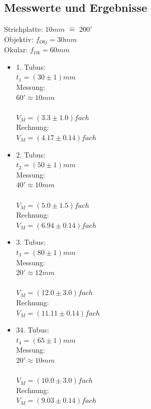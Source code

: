 \documentclass[12pt,a4paper]{article}
\begin{document}
\begin{multicols}{2}
\subsection{Messwerte und Ergebnisse}

Strichplatte: $10mm$ $\widehat{=}$ $200'$\\
Objektiv: $f_{Obj}=30mm$\\
Okular: $f_{Ok}=60mm$\\

\begin{itemize}

	\item 1. Tubus:\\
	$t_1=(30 \pm 1) mm$\\
	Messung:\\
	$60' \approx 10mm$\\
	\\
	$V_M= (3.3 \pm 1.0)fach$\\
	Rechnung: \\
	$V_M=(4.17\pm 0.14)fach$
	
	\item 2. Tubus:\\
	$t_2=(50 \pm 1) mm$\\
	Messung:\\
	$40' \approx 10mm$\\
	\\
	$V_M= (5.0 \pm 1.5)fach$\\
	Rechnung: \\
	$V_M=(6.94 \pm 0.14)fach$
	
	\item 3. Tubus:\\
	$t_3=(80 \pm 1) mm$\\
	Messung:\\
	$20' \approx 12mm$\\
	\\
	$V_M= (12.0 \pm 3.0)fach$\\
	Rechnung: \\
	$V_M=(11.11 \pm 0.14)fach$
	
	\item 34. Tubus:\\
	$t_4=(65 \pm 1) mm$\\
	Messung:\\
	$20' \approx 10mm$\\
	\\
	$V_M= (10.0 \pm 3.0)fach$\\
	Rechnung: \\
	$V_M=(9.03 \pm 0.14)fach$
	

\end{itemize}
\end{multicols}
\end{document}
